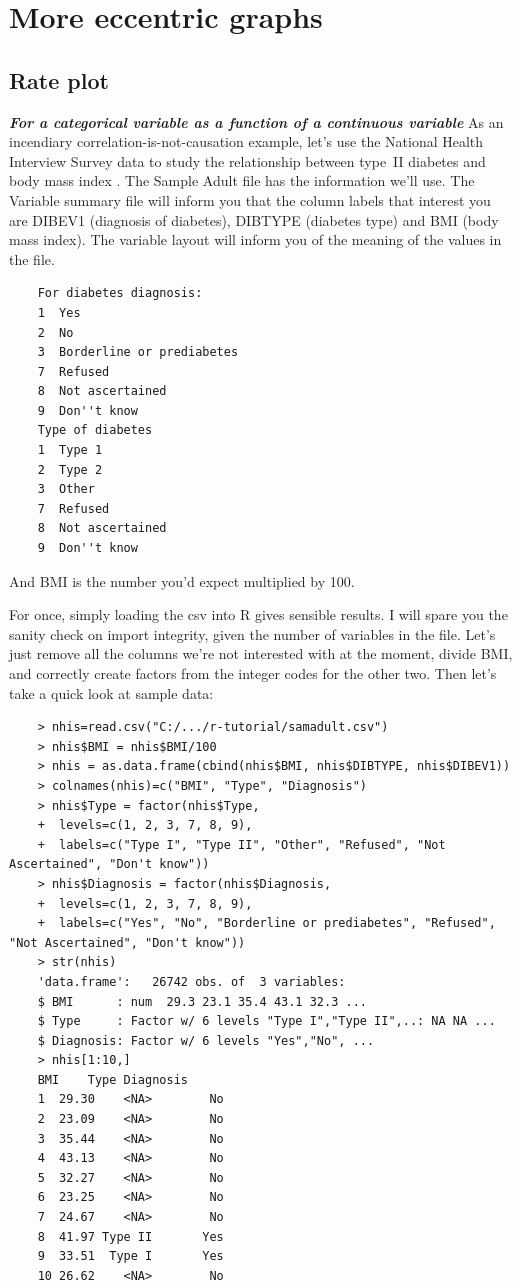 \documentclass{report}
\newcommand{\notefor}[1]{\hfill\textbf{\textit{#1}}}
\begin{document}
		
	
\chapter{More eccentric graphs}
	\section{Rate plot}\label{sec:cdplot}
	\notefor{For a categorical variable as a function of a continuous variable}
	As an incendiary correlation-is-not-causation example, let's use the National Health Interview Survey data to study the relationship between type~II diabetes and body mass index \cite{nhis}. The Sample Adult file has the information we'll use. The Variable summary file will inform you that the column labels that interest you are DIBEV1 (diagnosis of diabetes), DIBTYPE (diabetes type) and BMI (body mass index). The variable layout will inform you of the meaning of the values in the file.
	\begin{verbatim}
	For diabetes diagnosis: 
	1  Yes
	2  No
	3  Borderline or prediabetes
	7  Refused
	8  Not ascertained
	9  Don''t know 
	Type of diabetes
	1  Type 1
	2  Type 2
	3  Other
	7  Refused
	8  Not ascertained
	9  Don''t know 
	\end{verbatim}
	And BMI is the number you'd expect multiplied by 100.
	
	For once, simply loading the csv into R gives sensible results. I will spare you the sanity check on import integrity, given the number of variables in the file. Let's just remove all the columns we're not interested with at the moment, divide BMI, and correctly create factors from the integer codes for the other two. Then let's take a quick look at sample data:
	\begin{verbatim}
	> nhis=read.csv("C:/.../r-tutorial/samadult.csv")
	> nhis$BMI = nhis$BMI/100
	> nhis = as.data.frame(cbind(nhis$BMI, nhis$DIBTYPE, nhis$DIBEV1))
	> colnames(nhis)=c("BMI", "Type", "Diagnosis")
	> nhis$Type = factor(nhis$Type, 
	+  levels=c(1, 2, 3, 7, 8, 9), 
	+  labels=c("Type I", "Type II", "Other", "Refused", "Not Ascertained", "Don't know"))
	> nhis$Diagnosis = factor(nhis$Diagnosis, 
	+  levels=c(1, 2, 3, 7, 8, 9), 
	+  labels=c("Yes", "No", "Borderline or prediabetes", "Refused", "Not Ascertained", "Don't know"))
	> str(nhis)
	'data.frame':   26742 obs. of  3 variables:
	$ BMI      : num  29.3 23.1 35.4 43.1 32.3 ...
	$ Type     : Factor w/ 6 levels "Type I","Type II",..: NA NA ...
	$ Diagnosis: Factor w/ 6 levels "Yes","No", ...
	> nhis[1:10,]
	BMI    Type Diagnosis
	1  29.30    <NA>        No
	2  23.09    <NA>        No
	3  35.44    <NA>        No
	4  43.13    <NA>        No
	5  32.27    <NA>        No
	6  23.25    <NA>        No
	7  24.67    <NA>        No
	8  41.97 Type II       Yes
	9  33.51  Type I       Yes
	10 26.62    <NA>        No
	\end{verbatim}
	
\end{document}
